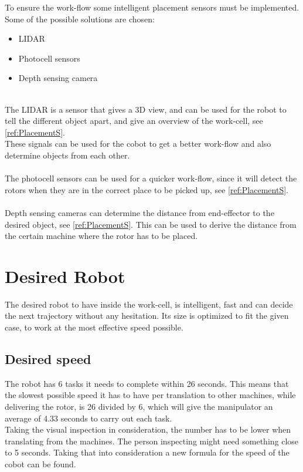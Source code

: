 To ensure the work-flow some intelligent placement sensors must be implemented. Some of the possible solutions are chosen:\\

\begin{itemize}
    \item LIDAR
    \item Photocell sensors
    \item Depth sensing camera
\end{itemize}
\\
The LIDAR is a sensor that gives a 3D view, and can be used for the robot to tell the different object apart, and give an overview of the work-cell, see \ref{ref:PlacementS}.\\
These signals can be used for the cobot to get a better work-flow and also determine objects from each other.\\
\\
The photocell sensors can be used for a quicker work-flow, since it will detect the rotors when they are in the correct place to be picked up, see \ref{ref:PlacementS}.\\
\\
Depth sensing cameras can determine the distance from end-effector to the desired object, see \ref{ref:PlacementS}. This can be used to derive the distance from the certain machine where the rotor has to be placed.\\


\section{Desired Robot}\label{IdealRobot}

The desired robot to have inside the work-cell, is intelligent, fast and can decide the next trajectory without any hesitation. Its size is optimized to fit the given case, to work at the most effective speed possible.\\

\subsection{Desired speed}

The robot has 6 tasks it needs to complete within 26 seconds. This means that the slowest possible speed it has to have per translation to other machines, while delivering the rotor, is 26 divided by 6, which will give the manipulator an average of 4.33 seconds to carry out each task.\\
Taking the visual inspection in consideration, the number has to be lower when translating from the machines. The person inspecting might need something close to 5 seconds. Taking that into consideration a new formula for the speed of the cobot can be found.\\

